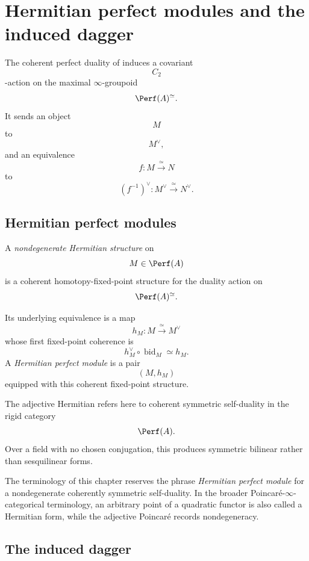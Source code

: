 \section{Hermitian perfect modules and the induced dagger}
\label{sec:hermitian-perfect-modules}

The coherent perfect duality of
induces a covariant
\[
    C_2
\]
-action on the maximal $\infty$-groupoid
\[
    \Perf(A)^\simeq.
\]
It sends an object
\[
    M
\]
to
\[
    M^\vee,
\]
and an equivalence
\[
    f
    \colon
    M
    \xrightarrow{\;\simeq\;}
    N
\]
to
\[
    (f^{-1})^\vee
    \colon
    M^\vee
    \xrightarrow{\;\simeq\;}
    N^\vee.
\]


\subsection{Hermitian perfect modules}

\begin{definition}
\label{def:hermitian-perfect-module}
A \emph{nondegenerate Hermitian structure} on
\[
    M\in\Perf(A)
\]
is a coherent homotopy-fixed-point structure for the duality action on
\[
    \Perf(A)^\simeq.
\]

Its underlying equivalence is a map
\[
    h_M
    \colon
    M
    \xrightarrow{\;\simeq\;}
    M^\vee
\]
whose first fixed-point coherence is
\[
    h_M^\vee
    \circ
    \operatorname{bid}_M
    \simeq
    h_M.
\]
A \emph{Hermitian perfect module} is a pair
\[
    (M,h_M)
\]
equipped with this coherent fixed-point structure.
\end{definition}

\begin{remark}
\label{rem:hermitian-no-conjugation}
The adjective Hermitian refers here to coherent symmetric self-duality in
the rigid category
\[
    \Perf(A).
\]
Over a field with no chosen conjugation, this produces symmetric bilinear
rather than sesquilinear forms.

The terminology of this chapter reserves the phrase
\emph{Hermitian perfect module} for a nondegenerate coherently symmetric
self-duality. In the broader Poincar\'e-$\infty$-categorical terminology,
an arbitrary point of a quadratic functor is also called a Hermitian form,
while the adjective Poincar\'e records nondegeneracy.
\end{remark}


\subsection{The induced dagger}

